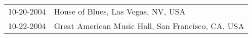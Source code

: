 \begin{supertabular}{ll}
 10-20-2004 &                 House of Blues, Las Vegas, NV, USA \\
 10-22-2004 &  Great American Music Hall, San Francisco, CA, USA \\
\end{supertabular}
